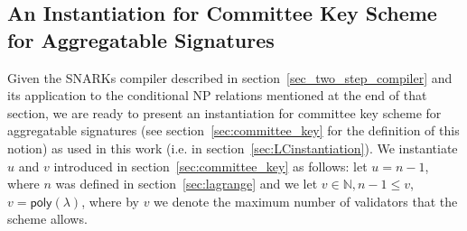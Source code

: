
\subsection{An Instantiation for Committee Key Scheme for Aggregatable Signatures}
\label{sec:inst_committee_key}
\noindent Given the SNARKs compiler described in section~\ref{sec_two_step_compiler} and its application to the conditional NP relations 
mentioned at the end of that section, we are ready to present an instantiation for committee key scheme for aggregatable signatures 
(see section~\ref{sec:committee_key} for the definition of this notion) as used in this work (i.e. in section~\ref{sec:LCinstantiation}). 
We instantiate $u$ and $v$ introduced in section~\ref{sec:committee_key} as follows: let $u = n-1$, where $n$ was defined in 
section~\ref{sec:lagrange} and we let $v \in \mathbb{N}, n-1 \leq v$, $v = \mathsf{poly}(\lambda)$, where by $v$ we denote the 
maximum number of validators that the scheme allows.


